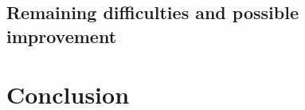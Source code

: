 \documentclass[paper=a4, french, 11pt]{scrartcl}
\begin{document}
\subsection{Remaining difficulties and possible improvement}

\section{Conclusion}




\end{document}
